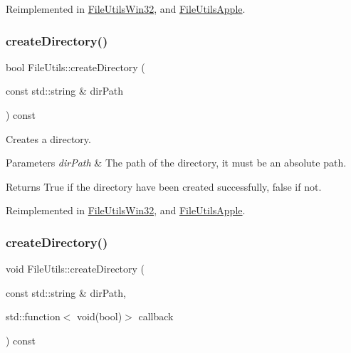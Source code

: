 Reimplemented in \hyperlink{classFileUtilsWin32_a6385e7d4763147cff2c158974d16adf8}{File\+Utils\+Win32}, and \hyperlink{classFileUtilsApple_a2b55deedf8b0fda7ceec1442f3944b1e}{File\+Utils\+Apple}.

\mbox{\label{classFileUtils_a9d9383b68669dcbef30165514f26d7f6}} 
\subsubsection{\texorpdfstring{create\+Directory()}{createDirectory()}\hspace{0.1cm}{\footnotesize\ttfamily [2/3]}}
{\footnotesize\ttfamily bool File\+Utils\+::create\+Directory (\begin{DoxyParamCaption}\item[{const std\+::string \&}]{dir\+Path }\end{DoxyParamCaption}) const\hspace{0.3cm}{\ttfamily [virtual]}}

Creates a directory.


\begin{DoxyParams}{Parameters}
{\em dir\+Path} & The path of the directory, it must be an absolute path. \\
\hline
\end{DoxyParams}
\begin{DoxyReturn}{Returns}
True if the directory have been created successfully, false if not. 
\end{DoxyReturn}


Reimplemented in \hyperlink{classFileUtilsWin32_a9da58952832ce4abc6c241e9db52a914}{File\+Utils\+Win32}, and \hyperlink{classFileUtilsApple_a104a38b7f8adf8de79f9ec2fcaa09735}{File\+Utils\+Apple}.

\mbox{\label{classFileUtils_a22d5e9d49b1239b73d123c321e1a802c}} 
\subsubsection{\texorpdfstring{create\+Directory()}{createDirectory()}\hspace{0.1cm}{\footnotesize\ttfamily [3/3]}}
{\footnotesize\ttfamily void File\+Utils\+::create\+Directory (\begin{DoxyParamCaption}\item[{const std\+::string \&}]{dir\+Path,  }\item[{std\+::function$<$ void(bool)$>$}]{callback }\end{DoxyParamCaption}) const\hspace{0.3cm}{\ttfamily [virtual]}}


